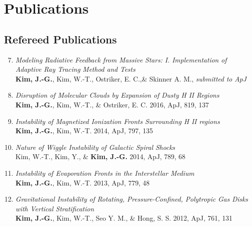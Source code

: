 \documentclass[11pt,letterpaper,roman]{moderncv}        %
\newenvironment{benumerate}[1]{
  \let\oldItem\item
  \def\item{\addtocounter{enumi}{-2}\oldItem}
  \begin{enumerate}[itemsep=0.0mm]
    \setcounter{enumi}{#1}
    \addtocounter{enumi}{1}
  }{
  \end{enumerate}
}
\begin{document}
\section{Publications}

\subsection{Refereed Publications
  \href{http://adsabs.harvard.edu/cgi-bin/nph-abs_connect?db_key=AST\&db_key=PRE\&qform=AST\&arxiv_sel=astro-ph\&arxiv_sel=cond-mat\&arxiv_sel=cs\&arxiv_sel=gr-qc\&arxiv_sel=hep-ex\&arxiv_sel=hep-lat\&arxiv_sel=hep-ph\&arxiv_sel=hep-th\&arxiv_sel=math\&arxiv_sel=math-ph\&arxiv_sel=nlin\&arxiv_sel=nucl-ex\&arxiv_sel=nucl-th\&arxiv_sel=physics\&arxiv_sel=quant-ph\&arxiv_sel=q-bio\&sim_query=YES\&ned_query=YES\&adsobj_query=YES\&aut_xct=YES\&aut_logic=OR\&obj_logic=OR\&author=Kim\%2C+Jeong-Gyu\&object=\&start_mon=\&start_year=\&end_mon=\&end_year=\&ttl_logic=OR\&title=\&txt_logic=OR\&text=\&nr_to_return=200\&start_nr=1\&jou_pick=ALL\&ref_stems=\&data_and=ALL\&group_and=ALL\&start_entry_day=\&start_entry_mon=\&start_entry_year=\&end_entry_day=\&end_entry_mon=\&end_entry_year=\&min_score=\&sort=SCORE\&data_type=SHORT\&aut_syn=YES\&ttl_syn=YES\&txt_syn=YES\&aut_wt=1.0\&obj_wt=1.0\&ttl_wt=0.3\&txt_wt=3.0\&aut_wgt=YES\&obj_wgt=YES\&ttl_wgt=YES\&txt_wgt=YES\&ttl_sco=YES\&txt_sco=YES\&version=1}{\color{blue}{(ADS Link)}}}

\begin{benumerate}{6}
\item \textit{Modeling Radiative Feedback from Massive Stars: I.
  Implementation of Adaptive Ray Tracing Method and Tests}\\
\textbf{Kim, J.-G.}, Kim, W.-T., Ostriker, E. C.,\& Skinner A. M.,
  \textit{submitted to ApJ}
\item \textit{Disruption of Molecular Clouds by Expansion of Dusty H II
  Regions}\\
\textbf{Kim, J.-G.}, Kim, W.-T., \& Ostriker, E. C. 2016, ApJ, 819,
137
\item \textit{Instability of Magnetized Ionization Fronts
  Surrounding H II regions}\\
\textbf{Kim, J.-G.}, Kim, W.-T. 2014, ApJ, 797, 135
\item \textit{Nature of Wiggle Instability of Galactic Spiral
  Shocks}\\
Kim, W.-T., Kim, Y., \& \textbf{Kim, J.-G.} 2014, ApJ, 789, 68
\item \textit{Instability of Evaporation Fronts in the
  Interstellar Medium}\\
\textbf{Kim, J.-G.}, Kim, W.-T. 2013, ApJ, 779, 48
\item \textit{Gravitational Instability of Rotating,
    Pressure-Confined,
    Polytropic Gas Disks with Vertical Stratification}\\
  \textbf{Kim, J.-G.}, Kim, W.-T., Seo Y. M., \& Hong, S. S. 2012,
  ApJ, 761, 131
\end{benumerate}
\end{document}
